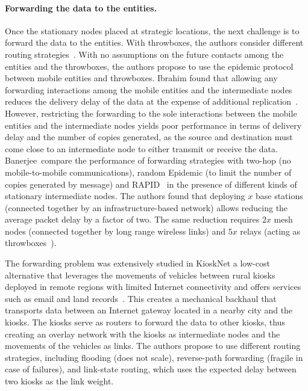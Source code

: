 \paragraph{Forwarding the data to the entities.}
Once the stationary nodes placed at strategic locations, the next challenge is to forward the data to the entities. With throwboxes, the authors consider different routing strategies~\cite{zhao2006capacity}. With no assumptions on the future contacts among the entities and the throwboxes, the authors propose to use the epidemic protocol between mobile entities and throwboxes. Ibrahim \etal found that allowing any forwarding interactions among the mobile entities and the intermediate nodes reduces the delivery delay of the data at the expense of additional replication~\cite{ibrahim2009analysis}. However, restricting the forwarding to the sole interactions between the mobile entities and the intermediate nodes yields poor performance in terms of delivery delay and the number of copies generated, as the source and destination must come close to an intermediate node to either transmit or receive the data. Banerjee~\etal compare the performance of forwarding strategies with two-hop (no mobile-to-mobile communications), random Epidemic (to limit the number of copies generated by message) and RAPID~\cite{balasubramanian2010replication} in the presence of different kinds of stationary intermediate nodes. The authors found that deploying $x$ base stations (connected together by an infrastructure-based network) allows reducing the average packet delay by a factor of two. The same reduction requires $2x$ mesh nodes (connected together by long range wireless links) and $5x$ relays (acting as throwboxes~\cite{zhao2006capacity}).

The forwarding problem was extensively studied in KioskNet a low-cost alternative that leverages the movements of vehicles between rural kiosks deployed in remote regions with limited Internet connectivity and offers services such as email and land records~\cite{seth2006low,guo2007very,guo2011design}. This creates a mechanical backhaul that transports data between an Internet gateway located in a nearby city and the kiosks. The kiosks serve as routers to forward the data to other kiosks, thus creating an overlay network with the kiosks as intermediate nodes and the movements of the vehicles as links. The authors propose to use different routing strategies, including flooding (does not scale), reverse-path forwarding (fragile in case of failures), and link-state routing, which uses the expected delay between two kiosks as the link weight. 

